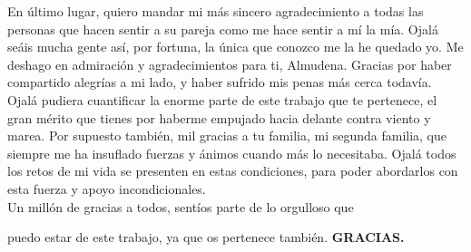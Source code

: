 En último lugar, quiero mandar mi más sincero agradecimiento a todas las personas que hacen sentir a su pareja como me hace sentir a mí la mía. Ojalá seáis mucha gente así, por fortuna, la única que conozco me la he quedado yo. Me deshago en admiración y agradecimientos para ti, Almudena. Gracias por haber compartido alegrías a mi lado, y haber sufrido mis penas más cerca todavía. Ojalá pudiera cuantificar la enorme parte de este trabajo que te pertenece, el gran mérito que tienes por haberme empujado hacia delante contra viento y marea. Por supuesto también, mil gracias a tu familia, mi segunda familia, que siempre me ha insuflado fuerzas y ánimos cuando más lo necesitaba. Ojalá todos los retos de mi vida se presenten en estas condiciones, para poder abordarlos con esta fuerza y apoyo incondicionales.\\


\hfill Un millón de gracias a todos, sentíos parte de lo orgulloso que

\hfill puedo estar de este trabajo, ya que os pertenece también. \textbf{GRACIAS.}


\restoregeometry


